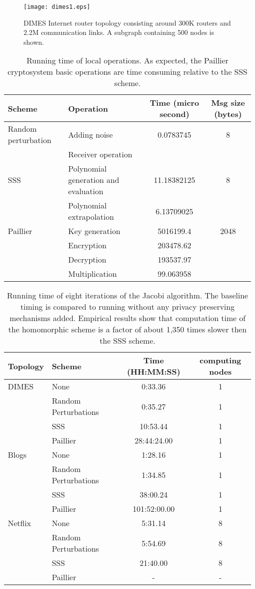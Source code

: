 \documentclass[times, 10pt,twocolumn]{article}
\begin{document}
\begin{figure}
\texttt{[image: dimes1.eps]}\\
  \caption{DIMES Internet router topology consisting around 300K routers and 2.2M communication links. A subgraph containing 500 nodes is shown.}\label{dimes}
\end{figure}

\begin{table*}[t!]
  \centering
\begin{tabular}{|l|l|c|c|}
\hline
  Scheme & Operation & Time (micro second) & Msg size (bytes)\\ \hline
  Random perturbation & Adding noise & 0.0783745  & 8\\
                     & Receiver operation &  &\\ \hline
  SSS & Polynomial generation and evaluation & 11.18382125 & 8 \\
          & Polynomial extrapolation & 6.13709025 & \\ \hline
  Paillier & Key generation & 5016199.4 & 2048\\
      & Encryption & 203478.62  &\\
 & Decryption & 193537.97   &\\
        & Multiplication & 99.063958 & \\
   \hline
\end{tabular}
  \label{local}
  \caption{Running time of local operations. As expected, the Paillier cryptosystem basic operations
  are time consuming relative to the SSS scheme.}\label{rt}
\end{table*}

\begin{table*}
  \centering
\begin{tabular}{|l|l|c|c|}
\hline
  Topology & Scheme & Time (HH:MM:SS) & computing nodes\\ \hline
  DIMES & None & 0:33.36 & 1\\
  & Random Perturbations & 0:35.27 & 1\\
         & SSS & 10:53.44 & 1\\
          & Paillier & 28:44:24.00 & 1\\ \hline
  Blogs & None & 1:28.16 & 1\\
        & Random Perturbations & 1:34.85 & 1\\
         & SSS & 38:00.24 & 1\\
          & Paillier & 101:52:00.00 & 1\\ \hline
  Netflix & None & 5:31.14 & 8\\
  & Random Perturbations & 5:54.69 & 8\\
         & SSS & 21:40.00 & 8 \\
          & Paillier & - & -\\
   \hline
\end{tabular}
  \caption{Running time of eight iterations of the Jacobi algorithm. The baseline timing is compared to running without
  any privacy preserving mechanisms added. Empirical results show that computation time of the homomorphic scheme is a factor of about 1,350 times slower
  then the SSS scheme.}\label{rt}
\end{table*}
\end{document}
